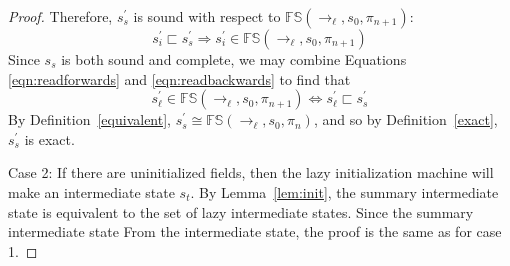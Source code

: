 \begin{proof}
 Therefore, $s_s^\prime$ is sound with respect to $\mathbb{FS}(\rightarrow_{\ell},s_0,\pi_{n+1})$:
 \begin{equation}
 \label{eqn:readbackwards}
 s_i^\prime \sqsubset s_s^\prime \Rightarrow s_i^\prime \in \mathbb{FS}(\rightarrow_{\ell},s_0,\pi_{n+1})
 \end{equation}
Since $s_s$ is both sound and complete, we may combine Equations \ref{eqn:readforwards} and \ref{eqn:readbackwards} to find that 
$$s_\ell^\prime \in \mathbb{FS}(\rightarrow_{\ell},s_0,\pi_{n+1}) \Leftrightarrow s_\ell^\prime \sqsubset s_s^\prime$$
By Definition~\ref{equivalent}, $s_s^\prime \cong \mathbb{FS}(\rightarrow_{\ell},s_0,\pi_n)$, and so by Definition~\ref{exact}, $s_s^\prime$ is exact.

Case 2: If there are uninitialized fields, then the lazy initialization machine will make an intermediate state $s_t$. By Lemma~\ref{lem:init}, the summary intermediate state is equivalent to the set of lazy intermediate states. Since the summary intermediate state From the intermediate state, the proof is the same as for case 1.
\end{proof}

